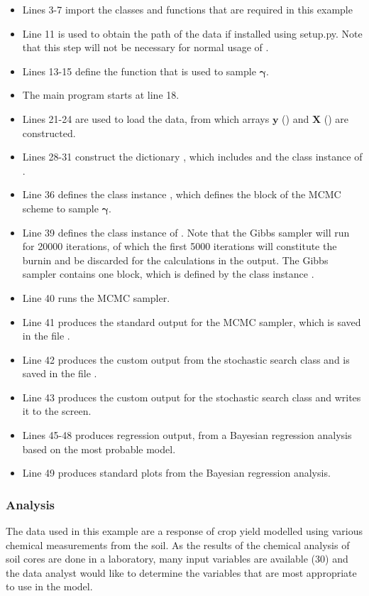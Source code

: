 \documentclass[article]{jss}
\begin{document}
\begin{itemize}
\item Lines 3-7 import the classes and functions that are required in this
example
\item Line 11 is used to obtain the path of the data if installed using
setup.py. Note that this step will not be necessary for normal usage
of .
\item Lines 13-15 define the function that is used to sample $\bm{\gamma}.$
\item The main program starts at line 18.
\item Lines 21-24 are used to load the data, from which arrays $\bm{y}$
() and $\bm{X}$ () are constructed.
\item Lines 28-31 construct the dictionary , which includes  and the class instance of .
\item Line 36 defines the class instance , which defines the
block of the MCMC scheme to sample $\bm{\gamma}$.
\item Line 39 defines the class instance of . Note that the Gibbs sampler
will run for 20000 iterations, of which the first 5000 iterations
will constitute the burnin and be discarded for the calculations in
the output. The Gibbs sampler contains one block, which is defined
by the class instance .
\item Line 40 runs the MCMC sampler.
\item Line 41 produces the standard output for the MCMC sampler, which is
saved in the file .
\item Line 42 produces the custom output from the stochastic search class
and is saved in the file .
\item Line 43 produces the custom output for the stochastic search class
and writes it to the screen.
\item Lines 45-48 produces regression output, from a Bayesian regression
analysis based on the most probable model.
\item Line 49 produces standard plots from the Bayesian regression analysis.
\end{itemize}

\subsubsection{Analysis}

The data used in this example are a response of crop yield modelled
using various chemical measurements from the soil. As the results of
the chemical analysis of soil cores are done in a laboratory, many
input variables are available (30) and the data analyst would like to
determine the variables that are most appropriate to use in the model.
\end{document}
